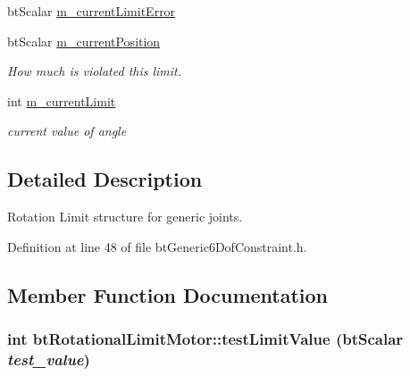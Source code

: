 \begin{Indent}{\bf }\par
\begin{CompactItemize}
\item 
btScalar \hyperlink{classbt_rotational_limit_motor_7128feccb391176842f287b584e375d3}{m\_\-currentLimitError}
\item 
\hypertarget{classbt_rotational_limit_motor_1f334e324d5e337257c2b338e8e948de}{
btScalar \hyperlink{classbt_rotational_limit_motor_1f334e324d5e337257c2b338e8e948de}{m\_\-currentPosition}}
\label{classbt_rotational_limit_motor_1f334e324d5e337257c2b338e8e948de}

\begin{CompactList}\small\item\em How much is violated this limit. \item\end{CompactList}\item 
int \hyperlink{classbt_rotational_limit_motor_d1e4fa6cb3ea2e4b78c96feab97448e8}{m\_\-currentLimit}
\begin{CompactList}\small\item\em current value of angle \item\end{CompactList}\end{CompactItemize}
\end{Indent}


\subsection{Detailed Description}
Rotation Limit structure for generic joints. 

Definition at line 48 of file btGeneric6DofConstraint.h.

\subsection{Member Function Documentation}
\hypertarget{classbt_rotational_limit_motor_c0651bd36beda2dbb23c45a90dc1cccd}{
\subsubsection[testLimitValue]{\setlength{\rightskip}{0pt plus 5cm}int btRotationalLimitMotor::testLimitValue (btScalar {\em test\_\-value})}}
\label{classbt_rotational_limit_motor_c0651bd36beda2dbb23c45a90dc1cccd}


